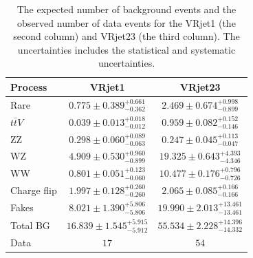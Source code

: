\begin{table}[htbp]
\begin{center}
\begin{tabular}{|l|c|c|}
\hline
\hline
Process & VRjet1 & VRjet23 \\
\hline
\hline
Rare        & $0.775\pm 0.389^{+0.661}_{-0.362}$ & $2.469 \pm 0.674^{+0.998} _{-0.899}$ \\
$t\bar{t}V$ & $0.039\pm 0.013^{+0.018}_{-0.012}$ & $0.959 \pm 0.082^{+0.152} _{-0.146}$ \\
ZZ          & $0.298\pm 0.060^{+0.089}_{-0.063}$ & $0.247 \pm 0.045^{+0.113} _{-0.047}$ \\
WZ          & $4.909\pm 0.530^{+0.960}_{-0.899}$ & $19.325\pm 0.643^{+4.393} _{-4.346}$ \\
WW          & $0.801\pm 0.051^{+0.123}_{-0.060}$ & $10.477\pm 0.176^{+0.796} _{-0.726}$ \\
Charge flip & $1.997\pm 0.128^{+0.260}_{-0.260}$ & $2.065 \pm 0.085^{+0.166} _{-0.166}$ \\
Fakes       & $8.021\pm 1.390^{+5.806}_{-5.806}$ & $19.990\pm 2.013^{+13.461}_{-13.461}$ \\
\hline
Total BG      & $16.839\pm 1.545^{+5.915}_{-5.912}$ & $55.534\pm 2.228^{+14.396}_{-14.332}$ \\
\hline
\hline
Data        & $17$ & $54$ \\
\hline
\hline
\end{tabular}
\caption{The expected number of background events and the observed number of data events for the VRjet1 (the second column) and VRjet23 (the third column). The uncertainties includes the statistical and systematic uncertainties.}
\label{tab:VR_yields}
\end{center}
\end{table}

